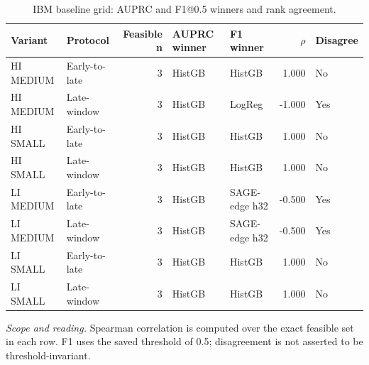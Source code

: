 \begin{table}[tbp]
\centering
\footnotesize
\setlength{\tabcolsep}{3.2pt}
\renewcommand{\arraystretch}{1.12}
\caption{IBM baseline grid: AUPRC and F1@0.5 winners and rank agreement.}
\label{tab:s-rank-baseline_grid}
\begin{tabularx}{\textwidth}{@{}>{\raggedright\arraybackslash}p{} >{\raggedright\arraybackslash}p{} r Y Y r l@{}}
\toprule
\textbf{Variant} & \textbf{Protocol} & \textbf{Feasible n} & \textbf{AUPRC winner} & \textbf{F1 winner} & \textbf{$\rho$} & \textbf{Disagree} \\
\midrule
HI MEDIUM & Early-to-late & 3 & HistGB & HistGB & 1.000 & No \\
HI MEDIUM & Late-window & 3 & HistGB & LogReg & -1.000 & Yes \\
HI SMALL & Early-to-late & 3 & HistGB & HistGB & 1.000 & No \\
HI SMALL & Late-window & 3 & HistGB & HistGB & 1.000 & No \\
LI MEDIUM & Early-to-late & 3 & HistGB & SAGE-edge h32 & -0.500 & Yes \\
LI MEDIUM & Late-window & 3 & HistGB & SAGE-edge h32 & -0.500 & Yes \\
LI SMALL & Early-to-late & 3 & HistGB & HistGB & 1.000 & No \\
LI SMALL & Late-window & 3 & HistGB & HistGB & 1.000 & No \\
\bottomrule
\end{tabularx}
\vspace{2pt}
\begin{minipage}{\textwidth}\footnotesize\emph{Scope and reading.} Spearman correlation is computed over the exact feasible set in each row. F1 uses the saved threshold of 0.5; disagreement is not asserted to be threshold-invariant.\end{minipage}
\end{table}
